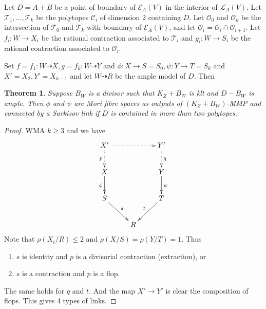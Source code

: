 \documentclass{article}
\newtheorem{thm}[defn]{Theorem}
\begin{document}
Let $ D=A+B $ be a point of boundary of $ \mathcal{E}_A(V) $ in the interior of $ \mathcal{L}_A(V) $. Let $ \mathcal{T}_1, \ldots, \mathcal{T}_k $ be the polytopes $ \mathcal{C}_i $ of dimension $ 2 $ containing $ D $. Let $ \mathcal{O}_0 $ and $ \mathcal{O}_k $ be the intersection of $ \mathcal{T}_0 $ and $ \mathcal{T}_k $ with boundary of $ \mathcal{E}_A(V) $, and let $ \mathcal{O}_i=\mathcal{O}_i\cap\mathcal{O}_{i+1} $. Let $ f_i:W\to X_i $ be the rational contraction associated to $ \mathcal{T}_i $ and $ g_i:W\to S_i $ be the rational contraction associated to $ \mathcal{O}_i $.

Set $ f=f_1:W\dashrightarrow X, g=f_k:W\dashrightarrow Y $ and $ \phi:X\to S=S_0,\psi:Y\to T=S_k $ and $ X'=X_2,Y'=X_{k-1} $ and let $ W\dashrightarrow R $ be the ample model of $ D $. Then
\begin{thm}\label{constructlink}
  \cite[Theorem 3.7]{haconSarkisovProgram2011} Suppose $ B_W $ is a divisor such that $ K_Z+B_W $ is klt and $ D-B_W $ is ample. Then $ \phi $ and $ \psi $ are Mori fibre spaces as outputs of $ (K_Z+B_W) $-MMP and connected by a Sarkisov link if $ D $ is contained in more than two polytopes.
\end{thm}
\begin{proof}
  WMA $ k\geqslant 3 $ and we have 
  $$ \xymatrix{
  X'\ar@{.>}[d]_p\ar@{.>}[rr]&&Y'\ar@{.>}[d]^q\\
  X\ar[d]_{\phi}&&Y\ar[d]^\psi\\
  S\ar[rd]^s&&T\ar[ld]_t\\
  &R&} $$
Note that $ \rho(X_i/R)\leqslant 2 $ and $ \rho(X/S)=\rho(Y/T)=1 $. Thus 
\begin{enumerate}
  \item $ s $ is identity and $ p $ is a divisorial contraction (extraction), or
  \item $ s $ is a contraction and $ p $ is a flop.
\end{enumerate}
The same holds for $ q $ and $ t $. And the map $X'\to Y'$ is clear the composition of flops. This gives 4 types of links.
\end{proof}
\end{document}
